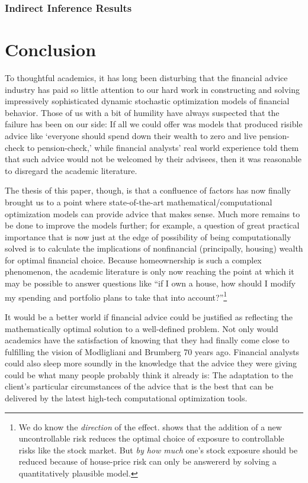 \documentclass{article}
\begin{document}
\subsubsection{Indirect Inference Results}

\section{Conclusion}

To thoughtful academics, it has long been disturbing that the financial advice industry has paid so little attention to our hard work in constructing and solving impressively sophisticated dynamic stochastic optimization models of financial behavior. Those of us with a bit of humility have always suspected that the failure has been on our side: If all we could offer was models that produced risible advice like `everyone should spend down their wealth to zero and live pension-check to pension-check,' while financial analysts' real world experience told them that such advice would not be welcomed by their advisees, then it was reasonable to disregard the academic literature.

The thesis of this paper, though, is that a confluence of factors has now finally brought us to a point where state-of-the-art mathematical/computational optimization models can provide advice that makes sense. Much more remains to be done to improve the models further; for example, a question of great practical importance that is now just at the edge of possibility of being computationally solved is to calculate the implications of nonfinancial (principally, housing) wealth for optimal financial choice. Because homeownership is such a complex phenomenon, the academic literature is only now reaching the point at which it may be possible to answer questions like ``if I own a house, how should I modify my spending and portfolio plans to take that into account?''\footnote{We do know the \textit{direction} of the effect. \cite{kimballStandardRA} shows that the addition of a new uncontrollable risk reduces the optimal choice of exposure to controllable risks like the stock market. But \textit{by how much} one's stock exposure should be reduced because of house-price risk can only be answererd by solving a quantitatively plausible model.}

It would be a better world if financial advice could be justified as reflecting the mathematically optimal solution to a well-defined problem.  Not only would academics have the satisfaction of knowing that they had finally come close to fulfilling the vision of Modligliani and Brumberg 70 years ago. Financial analysts could also sleep more soundly in the knowledge that the advice they were giving could be what many people probably think it already is: The adaptation to the client's particular circumstances of the advice that is the best that can be delivered by the latest high-tech computational optimization tools.
\end{document}
